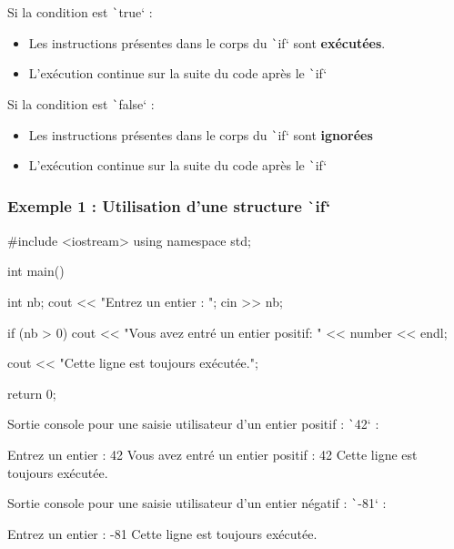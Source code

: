 \documentclass[10pt]{article}
\begin{document}
Si la condition est \texttt`true` :
\begin{itemize}
    \item Les instructions présentes dans le corps du \texttt`if` sont \textbf{exécutées}.
    \item L'exécution continue sur la suite du code après le \texttt`if` 
\end{itemize}
Si la condition est \texttt`false` :
\begin{itemize}
    \item Les instructions présentes dans le corps du \texttt`if` sont \textbf{ignorées}
    \item L'exécution continue sur la suite du code après le \texttt`if` 
\end{itemize}

\smallskip
\subsubsection{Exemple 1 : Utilisation d'une structure \texttt`if`}
\begin{cppcode}
    #include <iostream>
    using namespace std;

    int main() {
        int nb;
        cout << "Entrez un entier : ";
        cin >> nb;

        if (nb > 0) {
            cout << "Vous avez entré un entier positif: " << number << endl;
        }

        cout << "Cette ligne est toujours exécutée.";

        return 0;
    }

\end{cppcode}

\bigskip
Sortie console pour une saisie utilisateur d'un entier positif : \texttt`42`  :

\begin{textcode}
    Entrez un entier : 42
    Vous avez entré un entier positif : 42
    Cette ligne est toujours exécutée.
\end{textcode}

Sortie console pour une saisie utilisateur d'un entier négatif : \texttt`-81`  :

\begin{textcode}
    Entrez un entier : -81
    Cette ligne est toujours exécutée.
\end{textcode}
\end{document}
